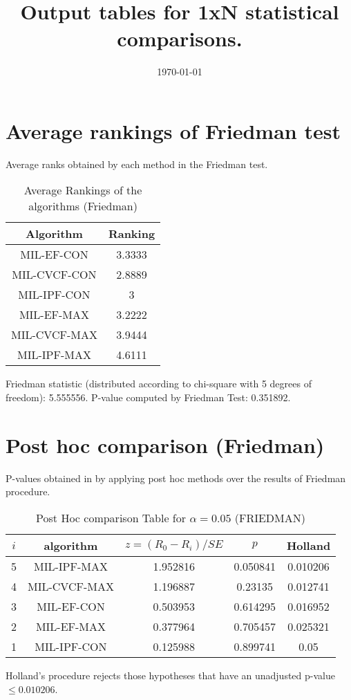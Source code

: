 \documentclass[a4paper,10pt]{article}
\title{Output tables for 1xN statistical comparisons.}
\author{}
\date{\today}
\begin{document}
\begin{landscape}
\pagestyle{empty}
\maketitle
\thispagestyle{empty}

\section{Average rankings of Friedman test}


Average ranks obtained by each method in the Friedman test.

\begin{table}[!htp]
\centering
\begin{tabular}{|c|c|}\hline
Algorithm&Ranking\\\hline
MIL-EF-CON&3.3333\\MIL-CVCF-CON&2.8889\\MIL-IPF-CON&3\\MIL-EF-MAX&3.2222\\MIL-CVCF-MAX&3.9444\\MIL-IPF-MAX&4.6111\\\hline\end{tabular}
\caption{Average Rankings of the algorithms (Friedman)}
\end{table}

Friedman statistic (distributed according to chi-square with 5 degrees of freedom): 5.555556. \newline P-value computed by Friedman Test: 0.351892.\newline


\newpage

\section{Post hoc comparison (Friedman)}


P-values obtained in by applying post hoc methods over the results of Friedman procedure.

\begin{table}[!htp]
\centering\footnotesize
\begin{tabular}{ccccc}
$i$&algorithm&$z=(R_0 - R_i)/SE$&$p$&Holland\\
\hline5&MIL-IPF-MAX&1.952816&0.050841&0.010206\\4&MIL-CVCF-MAX&1.196887&0.23135&0.012741\\3&MIL-EF-CON&0.503953&0.614295&0.016952\\2&MIL-EF-MAX&0.377964&0.705457&0.025321\\1&MIL-IPF-CON&0.125988&0.899741&0.05\\\hline
\end{tabular}
\caption{Post Hoc comparison Table for $\alpha=0.05$ (FRIEDMAN)}
\end{table}Holland's procedure rejects those hypotheses that have an unadjusted p-value $\le0.010206$.



\end{landscape}
\end{document}
